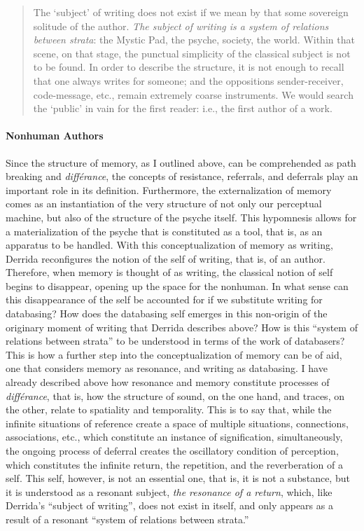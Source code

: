 \begin{quote}
	The `subject' of writing does not exist if we mean by that some sovereign solitude of the author. \textit{The subject of writing is a system of relations between strata}: the Mystic Pad, the psyche, society, the world. Within that scene, on that stage, the punctual simplicity of the classical subject is not to be found. In order to describe the structure, it is not enough to recall that one always writes for someone; and the oppositions sender-receiver, code-message, etc., remain extremely coarse instruments. We would search the `public' in vain for the first reader: i.e., the first author of a work. \im \parencite[227]{Der78:Wri}
\end{quote}

\paragraph{Nonhuman Authors}
Since the structure of memory, as I outlined above, can be comprehended as path breaking and \textit{différance}, the concepts of resistance, referrals, and deferrals play an important role in its definition. Furthermore, the externalization of memory comes as an instantiation of the very structure of not only our perceptual machine, but also of the structure of the psyche itself. This hypomnesis allows for a materialization of the psyche that is constituted as a tool, that is, as an apparatus to be handled. With this conceptualization of memory as writing, Derrida reconfigures the notion of the self of writing, that is, of an author. Therefore, when memory is thought of as writing, the classical notion of self begins to disappear, opening up the space for the nonhuman. In what sense can this disappearance of the self be accounted for if we substitute writing for databasing? How does the databasing self emerges in this non-origin of the originary moment of writing that Derrida describes above? How is this ``system of relations between strata'' to be understood in terms of the work of databasers? This is how a further step into the conceptualization of memory can be of aid, one that considers memory as resonance, and writing as databasing. I have already described above how resonance and memory constitute processes of \textit{différance}, that is, how the structure of sound, on the one hand, and traces, on the other, relate to spatiality and temporality. This is to say that, while the infinite situations of reference create a space of multiple situations, connections, associations, etc., which constitute an instance of signification, simultaneously, the ongoing process of deferral creates the oscillatory condition of perception, which constitutes the infinite return, the repetition, and the reverberation of a self. This self, however, is not an essential one, that is, it is not a substance, but it is understood as a resonant subject, \textit{the resonance of a return}, which, like Derrida's ``subject of writing'', does not exist in itself, and only appears as a result of a resonant ``system of relations between strata.'' 

